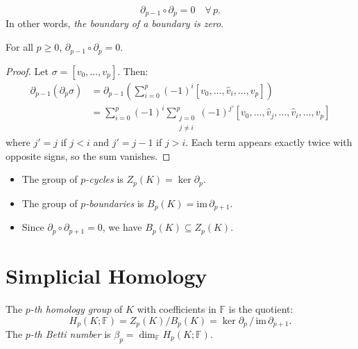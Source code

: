 \begin{keyformulas}[title=\textbf{Fundamental Property of the Boundary}]
\[
  \partial_{p-1} \circ \partial_p = 0 \quad \forall\, p.
\]
In other words, \emph{the boundary of a boundary is zero}.
\end{keyformulas}

\begin{proposition}
For all $p \geq 0$, $\partial_{p-1} \circ \partial_p = 0$.
\end{proposition}

\begin{proof}
Let $\sigma = [v_0, \ldots, v_p]$. Then:
\begin{align*}
\partial_{p-1}(\partial_p \sigma)
&= \partial_{p-1}\left(\sum_{i=0}^p (-1)^i
   [v_0,\ldots,\hat{v}_i,\ldots,v_p]\right) \\
&= \sum_{i=0}^p (-1)^i \sum_{\substack{j=0 \\ j \neq i}}^p (-1)^{j'}
   [v_0,\ldots,\hat{v}_j,\ldots,\hat{v}_i,\ldots,v_p]
\end{align*}
where $j' = j$ if $j < i$ and $j' = j-1$ if $j > i$. Each term appears
exactly twice with opposite signs, so the sum vanishes.
\end{proof}

\begin{definition}
\begin{itemize}
  \item The group of \emph{$p$-cycles} is $Z_p(K) = \ker \partial_p$.
  \item The group of \emph{$p$-boundaries} is
        $B_p(K) = \mathrm{im}\, \partial_{p+1}$.
  \item Since $\partial_p \circ \partial_{p+1} = 0$, we have
        $B_p(K) \subseteq Z_p(K)$.
\end{itemize}
\end{definition}

\section{Simplicial Homology}

\begin{definition}
The \emph{$p$-th homology group} of $K$ with coefficients in
$\mathbb{F}$ is the quotient:
\[
  H_p(K; \mathbb{F}) = Z_p(K) / B_p(K)
  = \ker \partial_p \,/\, \mathrm{im}\, \partial_{p+1}.
\]
The \emph{$p$-th Betti number} is
$\beta_p = \dim_\mathbb{F} H_p(K; \mathbb{F})$.
\end{definition}


